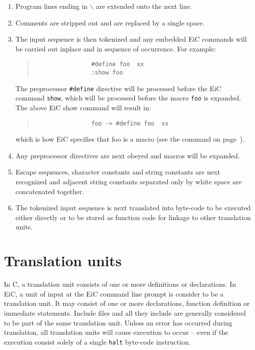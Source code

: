 \begin{enumerate}
\item  Program lines ending in {\tt $\backslash$} are extended onto the next line.
\item  Comments are stripped out and are replaced by a single space.
\item  The input sequence is then tokenized and any  
       embedded EiC commands  will be carried out inplace and in sequence
       of occurrence. For example:
        \begin{quote}
        \begin{verbatim}
                #define foo  xx
                :show foo
        \end{verbatim}
        \end{quote}
        The preprocessor {\tt \#define} directive will be processed
        before the EiC command {\tt show}, which will be processed
        before the macro {\tt foo} is expanded. The above EiC show command 
        will result in:
        \begin{quote}
        \begin{verbatim}
                foo -> #define foo  xx
        \end{verbatim}
        \end{quote}
        which is how EiC specifies that foo is a macro 
        (see the  command on page~\pageref{item:show}).

\item  Any preprocessor directives are next obeyed and macros will be
        expanded.

\item  Escape sequences, character constants and string constants
       are next recognized and adjacent string constants separated
        only by white space are concatenated together.

\item  The tokenized input sequence is next translated into byte-code to
        be executed either directly or to be stored as function code
        for linkage to other translation units.

\end{enumerate}  


\section{Translation units}
\label{sec:translationUnit}

In C, a translation unit consists of one or more definitions or
declarations. In EiC, a unit of input at the EiC command line prompt
is consider to be a translation unit. It may consist of one or more
declarations, function definition or immediate statements. Include
files and all they include are generally considered to be part of the
same translation unit. Unless an error has occurred during
translation, all translation units will cause execution to occur --
even if the execution consist solely of a single {\tt halt} byte-code
instruction.

